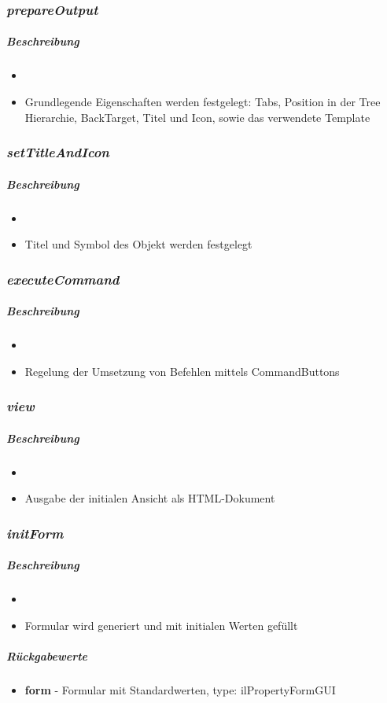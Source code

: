 \subsubsection*{\textit{prepareOutput}}\label{prepareOutputLGUI}
\subparagraph{Beschreibung}
\begin{itemize}
	\item[] \noindent{} 
	\item[] Grundlegende Eigenschaften werden festgelegt: Tabs, Position in der Tree Hierarchie, BackTarget, Titel und Icon, sowie das verwendete Template
\end{itemize}

\subsubsection*{\textit{setTitleAndIcon}}\label{setTitleAndIconLGUI}
\subparagraph{Beschreibung}
\begin{itemize}
	\item[] \noindent{} 
	\item[] Titel und Symbol des Objekt werden festgelegt
\end{itemize}

\subsubsection*{\textit{executeCommand}}\label{executeCommandLGUI}
\subparagraph{Beschreibung}
\begin{itemize}
	\item[] \noindent{} 
	\item[] Regelung der Umsetzung von Befehlen mittels CommandButtons
\end{itemize}

\subsubsection*{\textit{view}}\label{viewLGUI}
\subparagraph{Beschreibung}
\begin{itemize}
	\item[] \noindent{} 
	\item[] Ausgabe der initialen Ansicht als HTML-Dokument
\end{itemize}

\subsubsection*{\textit{initForm}}\label{initFormLGUI}
\subparagraph{Beschreibung}
\begin{itemize}
	\item[] \noindent{} 
	\item[] Formular wird generiert und mit initialen Werten gefüllt
\end{itemize}
\subparagraph{Rückgabewerte}
\begin{itemize}
\item[] \textbf{form} - Formular mit Standardwerten, type: ilPropertyFormGUI
\end{itemize}


